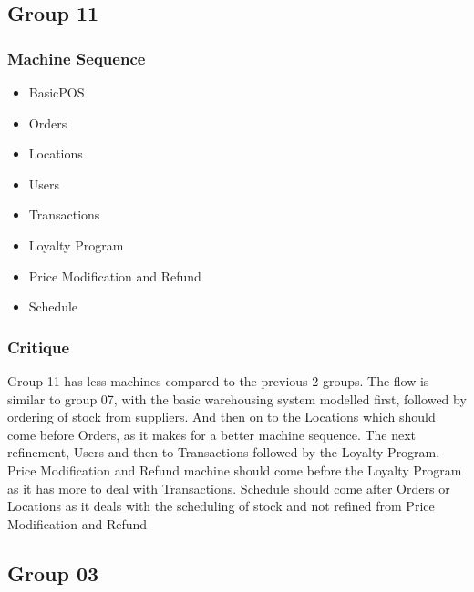 \subsection{Group 11}
\label{group11}

\subsubsection{Machine Sequence}
\label{machinesequence}

\begin{itemize}
\item BasicPOS

\item Orders

\item Locations

\item Users

\item Transactions

\item Loyalty Program

\item Price Modification and Refund

\item Schedule

\end{itemize}

\subsubsection{Critique}
\label{critique}

Group 11 has less machines compared to the previous 2 groups. The flow is similar to group 07, with the basic warehousing system modelled first, followed by ordering of stock from suppliers. And then on to the Locations which should come before Orders, as it makes for a better machine sequence. The next refinement, Users and then to Transactions followed by the Loyalty Program. Price Modification and Refund machine should come before the Loyalty Program as it has more to deal with Transactions. Schedule should come after Orders or Locations as it deals with the scheduling of stock and not refined from Price Modification and Refund

\subsection{Group 03}
\label{group03}

